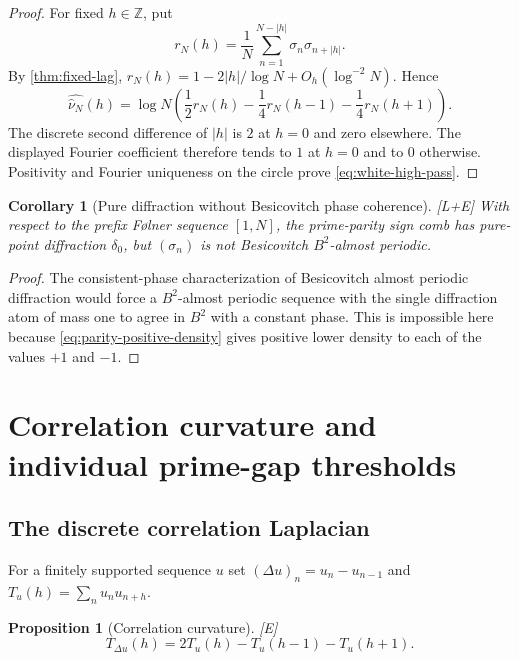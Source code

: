 \documentclass[11pt]{article}
\newtheorem{proposition}[theorem]{Proposition}
\newtheorem{corollary}[theorem]{Corollary}
\theoremstyle{definition}
\theoremstyle{remark}
\newcommand{\status}[1]{\textnormal{\textcolor{accent}{\footnotesize[#1]}}}
\begin{document}
\begin{proof}
For fixed $h\in\mathbb Z$, put
\[
 r_N(h)=\frac1N\sum_{n=1}^{N-|h|}\sigma_n\sigma_{n+|h|}.
\]
By \cref{thm:fixed-lag},
$r_N(h)=1-2|h|/\log N+O_h(\log^{-2}N)$.  Hence
\[
 \widehat{\widehat\nu_N}(h)
 =\log N\left(\frac12r_N(h)-\frac14r_N(h-1)-\frac14r_N(h+1)\right).
\]
The discrete second difference of $|h|$ is $2$ at $h=0$ and zero elsewhere.
The displayed Fourier coefficient therefore tends to $1$ at $h=0$ and to $0$
otherwise.  Positivity and Fourier uniqueness on the circle prove
\eqref{eq:white-high-pass}.
\end{proof}

\begin{corollary}[Pure diffraction without Besicovitch phase coherence]
\label{cor:not-B2-AP}
\status{L+E}
With respect to the prefix F\o lner sequence $[1,N]$, the prime-parity sign comb has
pure-point diffraction $\delta_0$, but $(\sigma_n)$ is not Besicovitch
$B^2$-almost periodic.
\end{corollary}

\begin{proof}
The consistent-phase characterization of Besicovitch almost periodic diffraction
\cite{LenzSpindelerStrungaru} would force a $B^2$-almost periodic sequence with the
single diffraction atom of mass one to agree in $B^2$ with a constant phase.  This is
impossible here because \eqref{eq:parity-positive-density} gives positive lower density
to each of the values $+1$ and $-1$.
\end{proof}

\section{Correlation curvature and individual prime-gap thresholds}

\subsection{The discrete correlation Laplacian}

For a finitely supported sequence $u$ set $(\Delta u)_n=u_n-u_{n-1}$ and
$T_u(h)=\sum_nu_nu_{n+h}$.

\begin{proposition}[Correlation curvature]\label{prop:correlation-laplacian}
\status{E}
\begin{equation}\label{eq:correlation-laplacian}
 T_{\Delta u}(h)=2T_u(h)-T_u(h-1)-T_u(h+1).
\end{equation}
\end{proposition}
\end{document}

